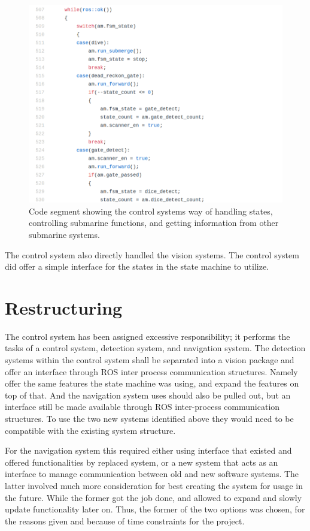 \begin{figure}
\centering
\includegraphics[width=150mm]{Figures/DirectStateHandling}
\decoRule
\caption[Direct State Handling]{Code segment showing the control systems way of handling states, controlling submarine functions, and getting information from other submarine systems.}
\label{fig:DirectStateHandling}
\end{figure}

The control system also directly handled the vision systems. The control system did offer a simple interface for the states in the state machine to utilize.


\section{Restructuring}

The control system has been assigned excessive responsibility; it performs the tasks of a control system, detection system, and navigation system. The detection systems within the control system shall be separated into a vision package and offer an interface through ROS inter process communication structures. Namely offer the same features the state machine was using, and expand the features on top of that. And the navigation system uses should also be pulled out, but an interface still be made available through ROS inter-process communication structures. To use the two new systems identified above they would need to be compatible with the existing system structure.

For the navigation system this required either using interface that existed and offered functionalities by replaced system, or a new system that acts as an interface to manage communication between old and new software systems. The latter involved much more consideration for best creating the system for usage in the future. While the former got the job done, and allowed to expand and slowly update functionality later on. Thus, the former of the two options was chosen, for the reasons given and because of time constraints for the project.

